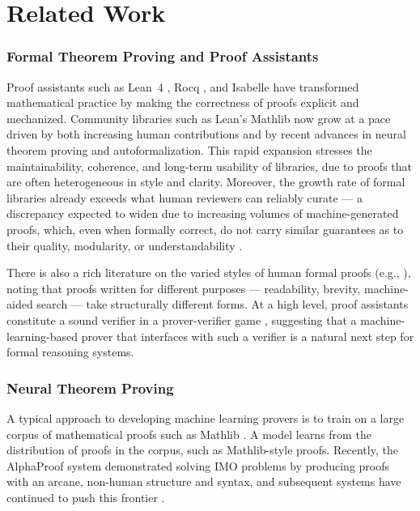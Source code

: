 \chapter{Related Work}\label{chap:related-work}

\setlength{\parindent}{1em}

\subsection{Formal Theorem Proving and Proof Assistants}
\label{sec:rw_formal}

Proof assistants such as Lean~4 \cite{LeanTheoremProver}, Rocq \cite{RocqTheoremProver}, and Isabelle \cite{IsabelleTheoremProver} have transformed mathematical practice by making the correctness of proofs explicit and mechanized. Community libraries such as Lean's Mathlib \cite{Mathlib} now grow at a pace driven by both increasing human contributions and by recent advances in neural theorem proving and autoformalization. This rapid expansion stresses the maintainability, coherence, and long-term usability of libraries, due to proofs that are often heterogeneous in style and clarity. Moreover, the growth rate of formal libraries already exceeds what human reviewers can reliably curate --- a discrepancy expected to widen due to increasing volumes of machine-generated proofs, which, even when formally correct, do not carry similar guarantees as to their quality, modularity, or understandability \cite{SeedProver}.

There is also a rich literature on the varied styles of human formal proofs (e.g., \cite{serge2010,Wiedijk}), noting that proofs written for different purposes --- readability, brevity, machine-aided search --- take structurally different forms. At a high level, proof assistants constitute a sound verifier in a prover-verifier game \cite{prover-verifier-games}, suggesting that a machine-learning-based prover that interfaces with such a verifier is a natural next step for formal reasoning systems.

\subsection{Neural Theorem Proving}
\label{sec:rw_ntp}

A typical approach to developing machine learning provers \cite{polu2020generative} is to train on a large corpus of mathematical proofs such as Mathlib \cite{han2022proof,polu2022formal,lample2022hypertree,yang2023leandojo}. A model learns from the distribution of proofs in the corpus, such as Mathlib-style proofs. Recently, the AlphaProof \cite{alphaproof} system demonstrated solving IMO problems by producing proofs with an arcane, non-human structure and syntax, and subsequent systems have continued to push this frontier \cite{achim2025aristotleimolevelautomatedtheorem, SeedProver}.

